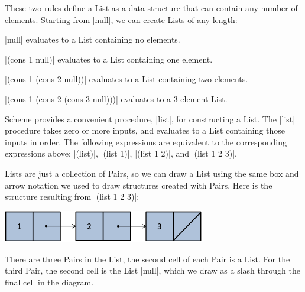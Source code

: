 \begin{schemeregion}
These two rules define a List as a data structure that can contain any number of elements.  Starting from \schemeresult|null|, we can create Lists of any length:
\begin{itemtight}
\item \scheme|null| evaluates to a List containing no elements.
\item \scheme|(cons 1 null)| evaluates to a List containing one element.
\item \scheme|(cons 1 (cons 2 null))| evaluates to a List containing two elements.
\item \scheme|(cons 1 (cons 2 (cons 3 null)))| evaluates to a 3-element List.
\end{itemtight}

Scheme provides a convenient procedure, \scheme|list|, for constructing a List.  The \scheme|list| procedure takes zero or more inputs, and evaluates to a List containing those inputs in order.  The following expressions are equivalent to the corresponding expressions above: \scheme|(list)|, \scheme|(list 1)|, \scheme|(list 1 2)|, and \scheme|(list 1 2 3)|.

Lists are just a collection of Pairs, so we can draw a List using the same box and arrow notation we used to draw structures created with Pairs.  Here is the structure resulting from \scheme|(list 1 2 3)|:  
\begin{center}
\includegraphics[width=3.5in]{figures/list.pdf}
\end{center}
There are three Pairs in the List, the second cell of each Pair is a List.  For the third Pair, the second cell is the List \scheme|null|, which we draw as a slash through the final cell in the diagram.


\end{schemeregion}
